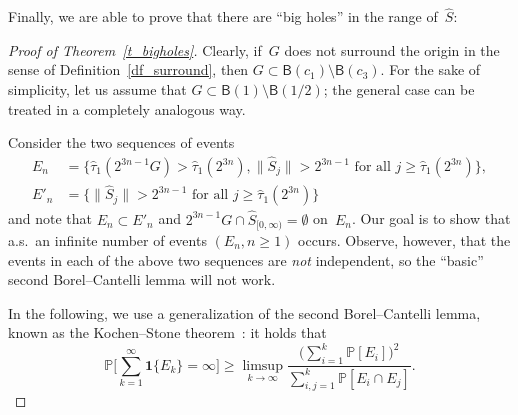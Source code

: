 \documentclass[10pt]{amsart}
\theoremstyle{definition}\newtheorem{defi}[theo]{Definition}\newtheorem{rema}[theo]{Remark}\newtheorem{exam}[theo]{Example}\newtheorem{exem}[theo]{Example}\newtheorem{nota}[theo]{Notation}
\newcommand{\1}[1]{{\mathbf 1}{\{#1\}}}
\newcommand{\s}{{\widehat S}}
\newcommand{\8}{{\infty}}
\newcommand{\IP}{{\mathbb P}}
\newcommand{\htau}{\widehat{\tau}}
\newcommand{\B}{{\mathsf B}}
\begin{document}
Finally, we are able to prove that there are ``big holes'' in the range of~$\s$:
\begin{proof}[Proof of Theorem~\ref{t_bigholes}]
Clearly, if~$G$ does not surround the origin in the sense of Definition~\ref{df_surround}, then $G\subset \B(c_1)\setminus \B(c_3)$. For the sake of simplicity, let us assume that $G\subset\B(1)\setminus \B(1/2)$; the general case can be treated in a completely analogous way.

Consider the two sequences of events
\begin{align*}
E_n &= \big\{\htau_1(2^{3n-1}G)>\htau_1(2^{3n}),
\|\s_j\| > 2^{3n-1} \text{ for all } j\geq \htau_1(2^{3n})\big\},\\
E'_n &= \big\{
\|\s_j\| > 2^{3n-1} \text{ for all } j\geq \htau_1(2^{3n})\big\}
\end{align*}
and note that $E_n\subset E'_n$ and $2^{3n-1}G\cap \s_{[0,\infty)}=\emptyset$ on~$E_n$. Our goal is to show that a.s.\ an infinite number of events $(E_n, n\geq 1)$ occurs. Observe, however, that the events in each of the above two sequences are \emph{not} independent, so the ``basic'' second Borel--Cantelli lemma will not work.

In the following, we use a generalization of the second Borel--Cantelli lemma, known as the Kochen--Stone theorem~\cite{KS64}: it holds that
\begin{equation}\label{Kochen--Stone}
\IP\Big[\sum_{k=1}^\infty \1{E_k}=\infty\Big] \geq
\limsup_{k\to\infty} \frac{\big(\sum_{i=1}^k\IP[E_i]\big)^2} {\sum_{i,j=1}^k\IP[E_i\cap E_j]}.
\end{equation}


\end{proof}
\end{document}
